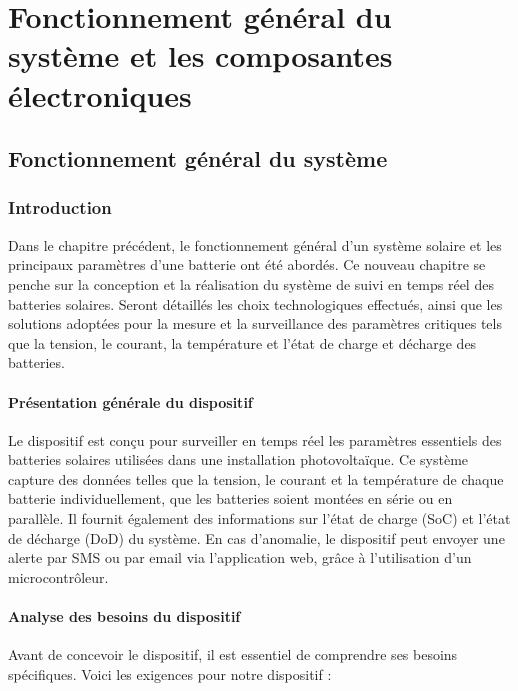 \chapter{Fonctionnement général du système et les composantes électroniques}
{}

\section{Fonctionnement général du système }
\subsection{Introduction}

Dans le chapitre précédent, le fonctionnement général d'un système solaire et les principaux paramètres d'une batterie ont été abordés. Ce nouveau chapitre se penche sur la conception et la réalisation du système de suivi en temps réel des batteries solaires. Seront détaillés les choix technologiques effectués, ainsi que les solutions adoptées pour la mesure et la surveillance des paramètres critiques tels que la tension, le courant, la température et l'état de charge et décharge des batteries.


\subsubsection{Présentation générale du dispositif}
Le dispositif est conçu pour surveiller en temps réel les paramètres essentiels des batteries solaires utilisées dans une installation photovoltaïque. Ce système capture des données telles que la tension, le courant et la température de chaque batterie individuellement, que les batteries soient montées en série ou en parallèle. Il fournit également des informations sur l'état de charge (SoC) et l'état de décharge (DoD) du système. En cas d'anomalie, le dispositif peut envoyer une alerte par SMS ou par email via l'application web, grâce à l'utilisation d'un microcontrôleur.

\subsubsection{Analyse des besoins du dispositif}
Avant de concevoir le dispositif, il est essentiel de comprendre ses besoins spécifiques. Voici les exigences pour notre dispositif :

